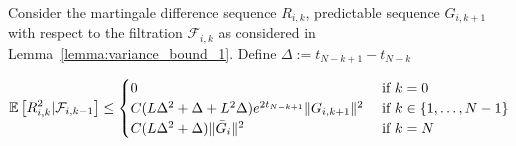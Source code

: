 \begin{lemma}\label{lemma:martingale_diff_variance_bound_appendix}

Consider the martingale difference sequence $R_{i,k}$, predictable sequence $G_{i,k+1}$ with respect to the filtration $\mathcal{F}_{i,k}$ as considered in Lemma~\ref{lemma:variance_bound_1}. Define $\Delta:=t_{N-k+1}-t_{N-k}$

\begin{equation}
    \mathbb{E}\left[R_{i,k}^{2}|\mathcal{F}_{i,k-1}\right] \leq \begin{cases} 0 &\text{ if } k = 0 \\
     C(L\Delta^2 + \Delta + L^2\Delta) e^{2t_{N-k+1}}\|G_{i,k+1}\|^2&\text{ if } k \in \{1,\dots,N-1\} \\
    C(L\Delta^2 + \Delta )\|\bar{G}_i\|^2 &\text{ if } k = N 
    \end{cases}
\end{equation}

\end{lemma}

